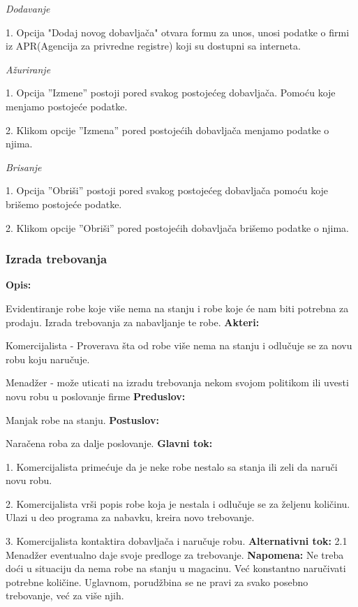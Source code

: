 \textit{Dodavanje}

1. Opcija "Dodaj novog dobavljača" otvara formu za unos, unosi podatke o firmi iz APR(Agencija za privredne registre) koji su dostupni sa interneta.

\textit{Ažuriranje}

1. Opcija ”Izmene” postoji pored svakog postojećeg dobavljača. Pomoću koje menjamo postojeće podatke.

2. Klikom opcije ”Izmena” pored postojećih dobavljača menjamo podatke o njima.

\textit{Brisanje}

1. Opcija ”Obriši” postoji pored svakog postojećeg dobavljača pomoću koje brišemo postojeće podatke.

2. Klikom opcije ”Obriši” pored postojećih dobavljača brišemo podatke o njima.

\clearpage

\subsubsection{Izrada trebovanja}

\textbf{Opis:}

Evidentiranje robe koje više nema na stanju i robe koje će nam biti potrebna za prodaju. Izrada trebovanja za nabavljanje te robe.
\newline
\textbf{Akteri:}

Komercijalista - Proverava šta od robe više nema na stanju i odlučuje se za novu robu koju naručuje.

Menadžer - može uticati na izradu trebovanja nekom svojom politikom ili uvesti novu robu u poslovanje firme 
\newline
\textbf{Preduslov:}

Manjak robe na stanju.
\newline
\textbf{Postuslov:}

Naračena roba za dalje poslovanje.
\newline
\textbf{Glavni tok:}

1. Komercijalista primećuje da je neke robe nestalo sa stanja ili zeli da naruči novu robu.

2. Komercijalista vrši popis robe koja je nestala i odlučuje se za željenu količinu.
Ulazi u deo programa za nabavku, kreira novo trebovanje.

3. Komercijalista kontaktira dobavljača i naručuje robu.
\newline
\textbf{Alternativni tok:}
2.1 Menadžer eventualno daje svoje predloge za trebovanje.
\newline
\textbf{Napomena:}
Ne treba doći u situaciju da nema robe na stanju u magacinu. Već konstantno naručivati potrebne količine. Uglavnom, porudžbina se ne pravi za svako posebno trebovanje, već za više njih.

